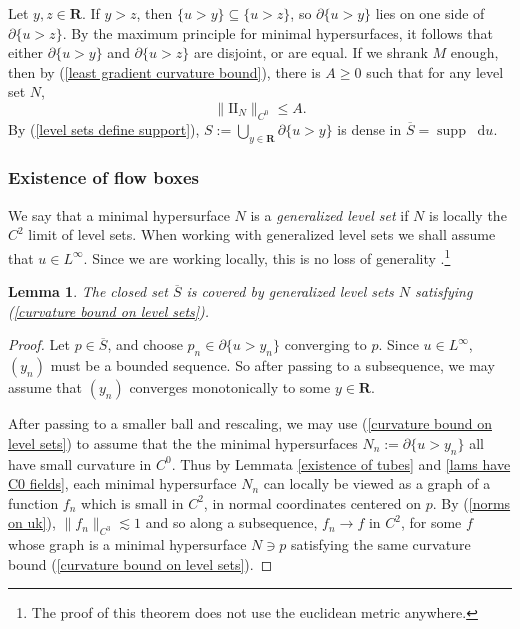 \documentclass[reqno,11pt]{amsart}
\newcommand{\RR}{\mathbf{R}}
\newcommand*\dif{\mathop{}\!\mathrm{d}}
\DeclareMathOperator{\supp}{supp}
\newcommand{\Two}{\mathrm{I\!I}}
\newcommand{\dfn}[1]{\emph{#1}\index{#1}}
\newtheorem{lemma}[theorem]{Lemma}
\theoremstyle{definition}
\numberwithin{equation}{section}
\begin{document}
Let $y, z \in \RR$. If $y > z$, then $\{u > y\} \subseteq \{u > z\}$, so $\partial \{u > y\}$ lies on one side of $\partial \{u > z\}$.
By the maximum principle for minimal hypersurfaces, it follows that either $\partial \{u > y\}$ and $\partial \{u > z\}$ are disjoint, or are equal.
If we shrank $M$ enough, then by (\ref{least gradient curvature bound}), there is $A \geq 0$ such that for any level set $N$,
\begin{equation}\label{curvature bound on level sets}
\|\Two_N\|_{C^0} \leq A.
\end{equation}
By (\ref{level sets define support}), $S := \bigcup_{y \in \RR} \partial \{u > y\}$ is dense in $\overline S = \supp \dif u$.

\subsubsection{Existence of flow boxes}
We say that a minimal hypersurface $N$ is a \dfn{generalized level set} if $N$ is locally the $C^2$ limit of level sets.
When working with generalized level sets we shall assume that $u \in L^\infty$.
Since we are working locally, this is no loss of generality \cite[Theorem 4.3]{Gorny20}.\footnote{The proof of this theorem does not use the euclidean metric anywhere.}

\begin{lemma}
The closed set $\overline S$ is covered by generalized level sets $N$ satisfying (\ref{curvature bound on level sets}).
\end{lemma}
\begin{proof}
Let $p \in \overline S$, and choose $p_n \in \partial \{u > y_n\}$ converging to $p$.
Since $u \in L^\infty$, $(y_n)$ must be a bounded sequence.
So after passing to a subsequence, we may assume that $(y_n)$ converges monotonically to some $y \in \RR$.

After passing to a smaller ball and rescaling, we may use (\ref{curvature bound on level sets}) to assume that the the minimal hypersurfaces $N_n := \partial \{u > y_n\}$ all have small curvature in $C^0$.
Thus by Lemmata \ref{existence of tubes} and \ref{lams have C0 fields}, each minimal hypersurface $N_n$ can locally be viewed as a graph of a function $f_n$ which is small in $C^2$, in normal coordinates centered on $p$.
By (\ref{norms on uk}), $\|f_n\|_{C^3} \lesssim 1$ and so along a subsequence, $f_n \to f$ in $C^2$, for some $f$ whose graph is a minimal hypersurface $N \ni p$ satisfying the same curvature bound (\ref{curvature bound on level sets}).
\end{proof}
\end{document}

